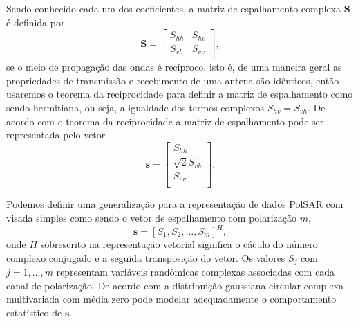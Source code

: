 Sendo conhecido cada um dos coeficientes, a matriz de espalhamento complexa $\mathbf{S}$ é definida por
\begin{equation}\label{cap_acf_2}
\mathbf{S} = \left[
\begin{array}{cc}
	S_{hh}   & S_{hv}   \\
	S_{vh}   & S_{vv}   \\
\end{array}
\right],
\end{equation}
se o meio de propagação das ondas é recíproco, isto é, de uma maneira geral as propriedades de transmissão e recebimento de uma antena são idênticos, então usaremos o teorema da reciprocidade \citet{lp} para definir a matriz de espalhamento como sendo hermitiana, ou seja, a igualdade dos termos complexos $S_{hv}=S_{vh}$. De acordo com o teorema da reciprocidade a matriz de espalhamento pode ser representada pelo vetor
\begin{equation}\label{cap_acf_3}
\mathbf{s} = \left[
\begin{array}{c}
	S_{hh}      \\
        \sqrt{2}S_{vh}     \\
	S_{vv}      \\
\end{array}
\right].
\end{equation}

Podemos definir uma generalização para a representação de dados PolSAR com visada simples como sendo o vetor de espalhamento com polarização $m$, $$\mathbf{s}=[S_1,S_2,\dots,S_m]^H,$$ onde $H$ sobrescrito na representação vetorial significa o cáculo do número complexo conjugado e a seguida transposição do vetor. Os valores $S_j$ com $j=1,\dots,m$ representam variáveis randômicas complexas associadas com cada canal de polarização. De acordo com \citet{good} a distribuição gaussiana circular complexa multivariada com média zero pode modelar adequadamente o comportamento estatístico de $\mathbf{s}$.  

